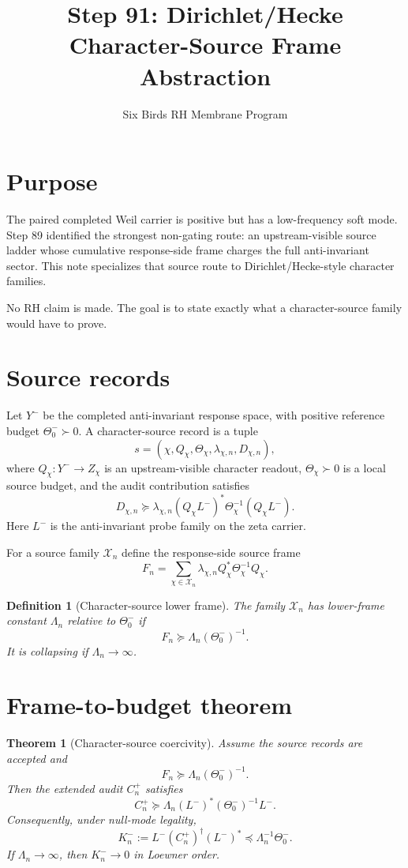 \documentclass[11pt]{article}
\title{Step 91: Dirichlet/Hecke Character-Source Frame Abstraction}
\author{Six Birds RH Membrane Program}
\date{}
\newtheorem{theorem}{Theorem}
\newtheorem{definition}{Definition}
\begin{document}
\maketitle

\section{Purpose}
The paired completed Weil carrier is positive but has a low-frequency soft mode.  Step 89 identified the strongest non-gating route: an upstream-visible source ladder whose cumulative response-side frame charges the full anti-invariant sector.  This note specializes that source route to Dirichlet/Hecke-style character families.

No RH claim is made.  The goal is to state exactly what a character-source family would have to prove.

\section{Source records}
Let $Y^-$ be the completed anti-invariant response space, with positive reference budget $\Theta_0^-\succ0$.  A character-source record is a tuple
\[
  s=(\chi,Q_\chi,\Theta_\chi,\lambda_{\chi,n},D_{\chi,n}),
\]
where $Q_\chi:Y^-\to Z_\chi$ is an upstream-visible character readout, $\Theta_\chi\succ0$ is a local source budget, and the audit contribution satisfies
\[
  D_{\chi,n}\succeq
  \lambda_{\chi,n}(Q_\chi L^-)^*\Theta_\chi^{-1}(Q_\chi L^-).
\]
Here $L^-$ is the anti-invariant probe family on the zeta carrier.

For a source family $\mathcal X_n$ define the response-side source frame
\[
  F_n=\sum_{\chi\in\mathcal X_n}\lambda_{\chi,n}
  Q_\chi^*\Theta_\chi^{-1}Q_\chi.
\]

\begin{definition}[Character-source lower frame]
The family $\mathcal X_n$ has lower-frame constant $\Lambda_n$ relative to $\Theta_0^-$ if
\[
  F_n\succeq \Lambda_n(\Theta_0^-)^{-1}.
\]
It is collapsing if $\Lambda_n\to\infty$.
\end{definition}

\section{Frame-to-budget theorem}
\begin{theorem}[Character-source coercivity]
Assume the source records are accepted and
\[
  F_n\succeq \Lambda_n(\Theta_0^-)^{-1}.
\]
Then the extended audit $C_n^+$ satisfies
\[
  C_n^+\succeq \Lambda_n (L^-)^*(\Theta_0^-)^{-1}L^-.
\]
Consequently, under null-mode legality,
\[
  K_n^-:=L^-(C_n^+)^\dagger(L^-)^*\preceq \Lambda_n^{-1}\Theta_0^-.
\]
If $\Lambda_n\to\infty$, then $K_n^-\to0$ in Loewner order.
\end{theorem}
\end{document}
